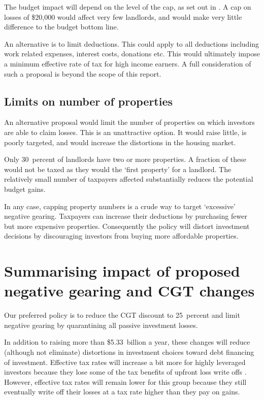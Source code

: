 \documentclass{grattan}\usepackage[]{graphicx}\usepackage[]{color}
\begin{document}
The budget impact will depend on the level of the cap, as set out in . A cap on losses of \$20,000  would affect very few landlords, and would make very little difference to the budget bottom line.

An alternative is to limit deductions. This could apply to all deductions including work related expenses, interest costs, donations etc. This would ultimately impose a minimum effective rate of tax for high income earners.   A full consideration of such a proposal is beyond the scope of this report. 

\subsection{Limits on number of properties}
An alternative proposal would limit the number of properties on which investors are able to claim losses.  This is an unattractive option. It would raise little, is poorly targeted, and would increase the distortions in the housing market.



Only 30~percent of landlords have two or more properties.  A fraction of these would not be taxed as they would the `first property' for a landlord. The relatively small number of taxpayers affected substantially reduces the potential budget gains. 

In any case, capping property numbers is a crude way to target `excessive' negative gearing. Taxpayers can increase their deductions by purchasing fewer but more expensive properties. Consequently the policy will distort investment decisions by discouraging investors from buying more affordable properties. 

\section{Summarising impact of proposed negative gearing and CGT changes}
Our preferred policy is to reduce the CGT discount to 25~percent and limit negative gearing by quarantining all passive investment losses. 

In addition to raising more than \$5.33~billion a year, these changes will reduce (although not eliminate) distortions in investment choices toward debt financing of investment. Effective tax rates will increase a bit more for highly leveraged investors because they lose some of the tax benefits of upfront loss write offs . However, effective tax rates will remain lower for this group because they still eventually write off their losses at a tax rate higher than they pay on gains. 
\end{document}
